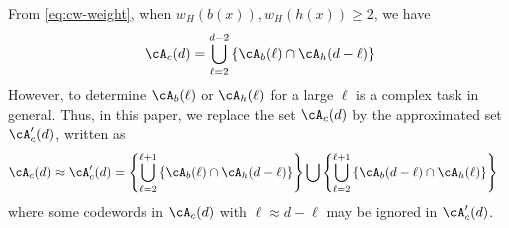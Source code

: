 From \eqref{eq:cw-weight}, when $w_H(b(x)), w_H(h(x)) \geq 2$, we have
\begin{align}
\cA_c(d) = \bigcup_{\ell = 2}^{d-2} \left\{\cA_b(\ell) \cap \cA_h(d-\ell)\right\}
\label{Eq:exactset}
\end{align}
However, to determine $\cA_b(\ell)$ or $\cA_h(\ell)$ for a large $\ell$ is a complex task in general. Thus, in this paper, we replace the set $\cA_c(d)$ by the approximated set $\cA_c'(d)$, written as %
\begin{equation}
\begin{split}
\cA_c(d) \approx \cA_c'(d) &= \left\{\bigcup_{\ell = 2}^{\ell+1} \left\{\cA_b(\ell) \cap \cA_h(d-\ell)\right\}\right\}\bigcup \left\{\bigcup_{\ell = 2}^{\ell+1} \left\{\cA_b(d-\ell) \cap \cA_h(\ell)\right\}\right\}
\end{split}
\label{setApprox}
\end{equation}
where some codewords in $\cA_c(d)$ with $\ell \approx d-\ell$ may be ignored in $\cA_c'(d)$.
%




